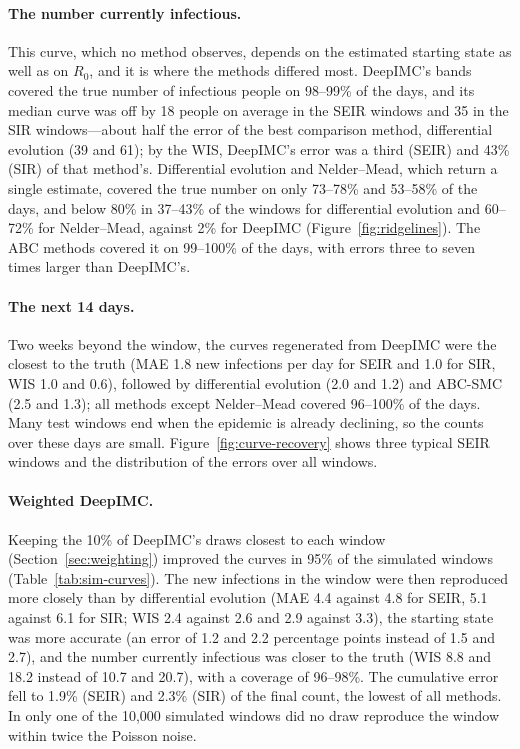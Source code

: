 \documentclass[12pt]{article}
\begin{document}
\paragraph{The number currently infectious.} This curve, which no method observes, depends on the estimated
starting state as well as on $R_0$, and it is where the methods differed most. DeepIMC's bands covered the true
number of infectious people on 98--99\% of the days, and its median curve was off by 18 people on average in the
SEIR windows and 35 in the SIR windows---about half the error of the best comparison method, differential
evolution (39 and 61); by the WIS, DeepIMC's error was a third (SEIR) and 43\% (SIR) of that method's.
Differential evolution and Nelder--Mead, which return a single estimate, covered the true number on only 73--78\%
and 53--58\% of the days, and below 80\% in 37--43\% of the windows for differential evolution and 60--72\% for
Nelder--Mead, against 2\% for DeepIMC (Figure~\ref{fig:ridgelines}). The ABC methods covered it on 99--100\% of
the days, with errors three to seven times larger than DeepIMC's.

\paragraph{The next 14 days.} Two weeks beyond the window, the curves regenerated from DeepIMC were the closest
to the truth (MAE 1.8 new infections per day for SEIR and 1.0 for SIR, WIS 1.0 and 0.6), followed by
differential evolution (2.0 and 1.2) and ABC-SMC (2.5 and 1.3); all methods except Nelder--Mead covered
96--100\% of the days. Many test windows end when the epidemic is already declining, so the counts over these
days are small. Figure~\ref{fig:curve-recovery} shows three typical SEIR windows and the distribution of the
errors over all windows.

\paragraph{Weighted DeepIMC.} Keeping the 10\% of DeepIMC's draws closest to each window
(Section~\ref{sec:weighting}) improved the curves in 95\% of the simulated windows (Table~\ref{tab:sim-curves}). The
new infections in the window were then reproduced more closely than by differential evolution (MAE 4.4 against
4.8 for SEIR, 5.1 against 6.1 for SIR; WIS 2.4 against 2.6 and 2.9 against 3.3), the starting state was more
accurate (an error of 1.2 and 2.2 percentage points instead of 1.5 and 2.7), and the number currently infectious
was closer to the truth (WIS 8.8 and 18.2 instead of 10.7 and 20.7), with a coverage of 96--98\%. The cumulative
error fell to 1.9\% (SEIR) and 2.3\% (SIR) of the final count, the lowest of all methods. In only one of the
10,000 simulated windows did no draw reproduce the window within twice the Poisson noise.
\end{document}
